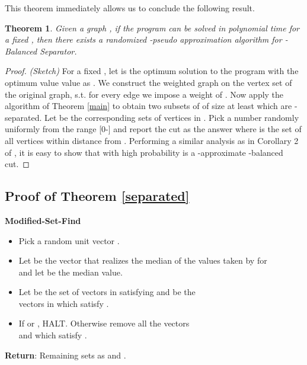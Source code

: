 \documentclass [11pt,a4paper]{article}
\newtheorem{theorem}{Theorem}
\begin{document}
This theorem immediately allows us to conclude the following result.
\begin{theorem}
Given a graph , if the program  can be solved in polynomial time for a fixed , then there 
exists a randomized -pseudo approximation algorithm for 
-{\sc Balanced Separator}. 
\end{theorem}

\begin{proof}\emph{(Sketch)}
For a fixed , let  is the optimum solution to the program  with the optimum value
value as . We construct the weighted graph  on the vertex set of the original graph, 
s.t. for every edge  
we impose a weight of . Now apply the algorithm of Theorem \ref{main}
to obtain two subsets  of  of size at least  which are 
-separated. 
Let  be the corresponding sets of vertices in . Pick a number  
randomly uniformly from the range [0-] and report the cut 
as the answer where  is the set of all vertices within distance  from . 
Performing a similar analysis as in Corollary 2 of \cite{ARV}, it is easy to show that with high 
probability  is a -approximate 
-balanced cut.
\end{proof}

\subsection{Proof of Theorem \ref{separated}}

\begin{algorithm}[ht]
\caption{\textbf{{\sc Modified}-Set-Find}}
\begin{itemize}
\item[1.] Pick a random unit vector . 
\item[2.] Let  be the vector that realizes the median of the values taken by 
 for \\
 and let  be the median value. 
\item[3.] Let  be the set of vectors in  satisfying 
and  be the \\
vectors in  which satisfy .
\item[4.] If  or , HALT. Otherwise remove all the vectors  
 \\
and  which satisfy .
\end{itemize}
\textbf{Return}: Remaining sets as  and .
\end{algorithm}
\end{document}
